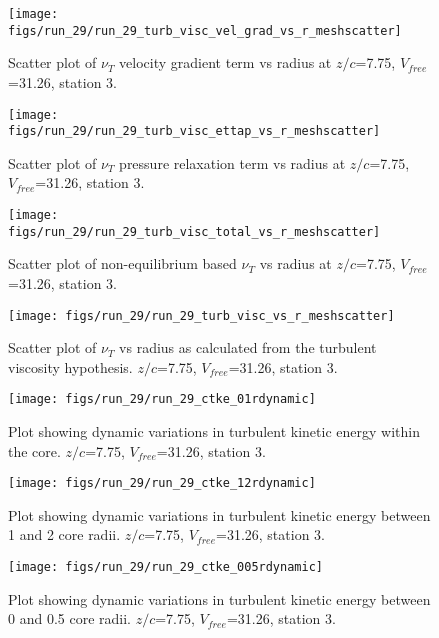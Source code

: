 \begin{figure}[H]
\centering
\texttt{[image: figs/run\_29/run\_29\_turb\_visc\_vel\_grad\_vs\_r\_meshscatter]}
\caption{Scatter plot of $\nu_T$ velocity gradient term vs radius at $z/c$=7.75, $V_{free}$=31.26, station 3.}
\end{figure}


\begin{figure}[H]
\centering
\texttt{[image: figs/run\_29/run\_29\_turb\_visc\_ettap\_vs\_r\_meshscatter]}
\caption{Scatter plot of $\nu_T$ pressure relaxation term vs radius at $z/c$=7.75, $V_{free}$=31.26, station 3.}
\end{figure}


\begin{figure}[H]
\centering
\texttt{[image: figs/run\_29/run\_29\_turb\_visc\_total\_vs\_r\_meshscatter]}
\caption{Scatter plot of non-equilibrium based $\nu_T$ vs radius at $z/c$=7.75, $V_{free}$=31.26, station 3.}
\end{figure}


\begin{figure}[H]
\centering
\texttt{[image: figs/run\_29/run\_29\_turb\_visc\_vs\_r\_meshscatter]}
\caption{Scatter plot of $\nu_T$ vs radius as calculated from the turbulent viscosity hypothesis. $z/c$=7.75, $V_{free}$=31.26, station 3.}
\end{figure}


\begin{figure}[H]
\centering
\texttt{[image: figs/run\_29/run\_29\_ctke\_01rdynamic]}
\caption{Plot showing dynamic variations in turbulent kinetic energy within the core. $z/c$=7.75, $V_{free}$=31.26, station 3.}
\end{figure}


\begin{figure}[H]
\centering
\texttt{[image: figs/run\_29/run\_29\_ctke\_12rdynamic]}
\caption{Plot showing dynamic variations in turbulent kinetic energy between 1 and 2 core radii. $z/c$=7.75, $V_{free}$=31.26, station 3.}
\end{figure}


\begin{figure}[H]
\centering
\texttt{[image: figs/run\_29/run\_29\_ctke\_005rdynamic]}
\caption{Plot showing dynamic variations in turbulent kinetic energy between 0 and 0.5 core radii. $z/c$=7.75, $V_{free}$=31.26, station 3.}
\end{figure}



